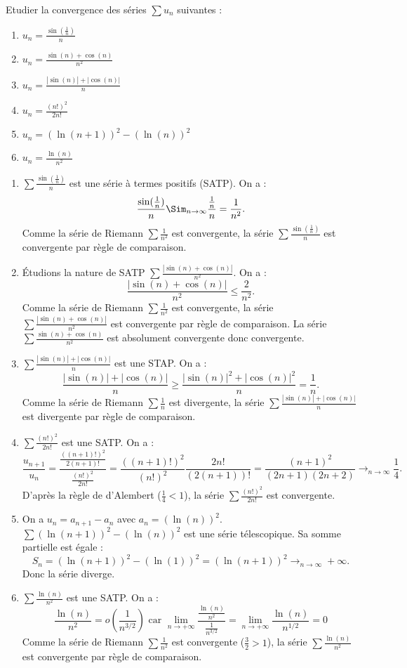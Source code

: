 \documentclass{book}
\begin{document}
\begin{Exercice}[ Nature]
Etudier la convergence des séries $\sum u_n$ suivantes :
    \begin{enumerate}
        \item $u_n =\frac{\sin(\frac 1 n)}{n}$ 
        \item $u_n=\frac{\sin(n)+\cos(n)}{n^2}$
        \item $u_n=\frac{|\sin(n)|+|\cos(n)|}{n}$
        \item $u_n=\frac{(n!)^2}{2n!}$
        \item $u_n=(\ln(n+1))^2-(\ln(n))^2$
        \item $u_n=\frac{\ln(n)}{n^2}$
    \end{enumerate}
\begin{Correction}
    \begin{enumerate}
        \item $\sum \frac{\sin(\frac 1 n)}{n}$ est une série à termes positifs (SATP). On a :
$$\frac{\sin(\frac 1 n)}{n}\Sim_{n\to\infty}\frac{\frac 1 n}{n}=\frac{1}{n^2}.$$
Comme la série de Riemann $\sum \frac{1}{n^2}$ est convergente, la série $\sum \frac{\sin(\frac 1 n)}{n}$ est convergente par règle de comparaison.
	   \item 	Étudions la nature de SATP $\sum \frac{|\sin(n)+\cos(n)|}{n^2}$. On a :
	   $$\frac{|\sin(n)+\cos(n)|}{n^2} \leq \frac{2}{n^2}.$$
	   Comme la série de Riemann $\sum \frac{1}{n^2}$ est convergente, la série $\sum \frac{|\sin(n)+\cos(n)|}{n^2}$ est convergente par règle de comparaison. La série 
	   $\sum \frac{\sin(n)+\cos(n)}{n^2}$ est absolument convergente donc convergente.
	   \item  $\sum\frac{|\sin(n)|+|\cos(n)|}{n}$ est une STAP. On a :
 	   $$\frac{|\sin(n)|+|\cos(n)|}{n} \geq \frac{|\sin(n)|^2+|\cos(n)|^2}{n}= \frac{1}{n}.$$
	   Comme la série de Riemann $\sum \frac{1}{n}$ est divergente, la série $\sum\frac{|\sin(n)|+|\cos(n)|}{n}$  est divergente par règle de comparaison.
	   \item 	$\sum\frac{(n!)^2}{2n!}$ est une SATP. On a :
 $$\frac{u_{n+1}}{u_n}=\frac{\frac{((n+1)!)^2}{2(n+1)!}}{\frac{(n!)^2}{2n!}}=\frac{((n+1)!)^2}{(n!)^2}\frac{2n!}{(2(n+1))!}=\frac{(n+1)^2}{(2n+1)(2n+2)}\to_{n\to\infty}\frac 1 4.$$	  
D'après la règle de d'Alembert ($\frac 1 4 <1$), la série $\sum\frac{(n!)^2}{2n!}$ est convergente.
	    \item  On a $u_n=a_{n+1}-a_n$  avec $a_n = (\ln(n))^2$. $\sum (\ln(n+1))^2-(\ln(n))^2$ est une série télescopique. Sa somme partielle est égale :
	    $$S_n =  (\ln(n+1))^2 - (\ln(1))^2=(\ln(n+1))^2\to_{n\to\infty} +\infty.$$
	    Donc la série diverge.
	    \item 	$\sum\frac{\ln(n)}{n^2}$ est une SATP. On a :
	    $$\frac{\ln(n)}{n^2}=o\left(\frac{1}{n^{3/2}}\right)\text{ car }\lim\limits_{n\to+\infty}\frac{\frac{\ln(n)}{n^2}}{\frac{1}{n^{3/2}}}=\lim\limits_{n\to+\infty}\frac{\ln(n)}{n^{1/2}}=0$$
	    Comme la série de Riemann $\sum \frac{1}{n^2}$ est convergente ($\frac{3}{2}>1$), la série $\sum\frac{\ln(n)}{n^2}$ est convergente par règle de comparaison.
    \end{enumerate}
\end{Correction}
\end{Exercice}
\end{document}
